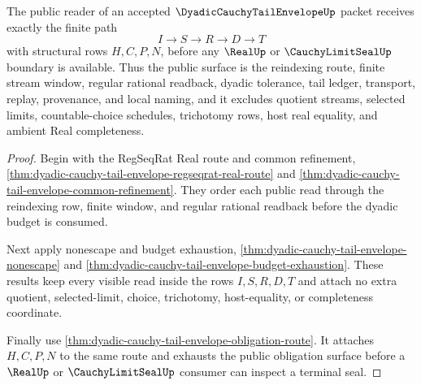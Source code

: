 \begin{theorem}
\label{thm:dyadic-cauchy-tail-envelope-public-boundary}
The public reader of an accepted $\DyadicCauchyTailEnvelopeUp$ packet receives exactly the finite path
$$
I \longrightarrow S \longrightarrow R \longrightarrow D \longrightarrow T
$$
with structural rows $H,C,P,N$, before any $\RealUp$ or $\CauchyLimitSealUp$ boundary is available. Thus the public surface is the reindexing route, finite stream window, regular rational readback, dyadic tolerance, tail ledger, transport, replay, provenance, and local naming, and it excludes quotient streams, selected limits, countable-choice schedules, trichotomy rows, host real equality, and ambient Real completeness.
\end{theorem}
\begin{proof}
Begin with the RegSeqRat Real route and common refinement, \autoref{thm:dyadic-cauchy-tail-envelope-regseqrat-real-route} and \autoref{thm:dyadic-cauchy-tail-envelope-common-refinement}. They order each public read through the reindexing row, finite window, and regular rational readback before the dyadic budget is consumed.

Next apply nonescape and budget exhaustion, \autoref{thm:dyadic-cauchy-tail-envelope-nonescape} and \autoref{thm:dyadic-cauchy-tail-envelope-budget-exhaustion}. These results keep every visible read inside the rows $I,S,R,D,T$ and attach no extra quotient, selected-limit, choice, trichotomy, host-equality, or completeness coordinate.

Finally use \autoref{thm:dyadic-cauchy-tail-envelope-obligation-route}. It attaches $H,C,P,N$ to the same route and exhausts the public obligation surface before a $\RealUp$ or $\CauchyLimitSealUp$ consumer can inspect a terminal seal.
\end{proof}

